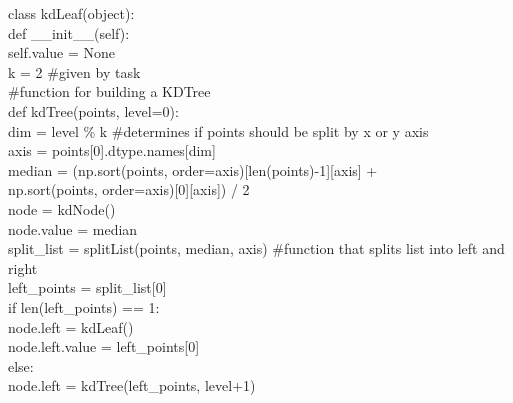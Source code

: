 \documentclass[english, fontsize=12pt, paper=a4, twoside=false, draft=true, pagesize=auto, version=last, DIV=16]{scrartcl}
\theoremstyle{break}
\begin{document}
class kdLeaf(object):\\
\hspace*{10mm}def \_\_init\_\_(self):\\
\hspace*{10mm}\hspace*{10mm}self.value = None\\

k = 2 \#given by task\\
\#function for building a KDTree\\
def kdTree(points, level=0):\\
\hspace*{10mm}dim = level \% k \#determines if points should be split by x or y axis\\
\hspace*{10mm}axis = points[0].dtype.names[dim]\\
\hspace*{10mm}median = (np.sort(points, order=axis)[len(points)-1][axis] +\\
\hspace*{10mm}\hspace*{10mm}\hspace*{10mm}np.sort(points, order=axis)[0][axis]) / 2\\
\hspace*{10mm}node = kdNode()\\
\hspace*{10mm}node.value = median\\
\hspace*{10mm}split\_list = splitList(points, median, axis) \#function that splits list into left and right\\
\hspace*{10mm}left\_points = split\_list[0]\\
\hspace*{10mm}if len(left\_points) == 1:\\
\hspace*{10mm}\hspace*{10mm}node.left = kdLeaf()\\
\hspace*{10mm}\hspace*{10mm}node.left.value = left\_points[0]\\
\hspace*{10mm}else:\\
\hspace*{10mm}\hspace*{10mm}node.left = kdTree(left\_points, level+1)\\
\end{document}
